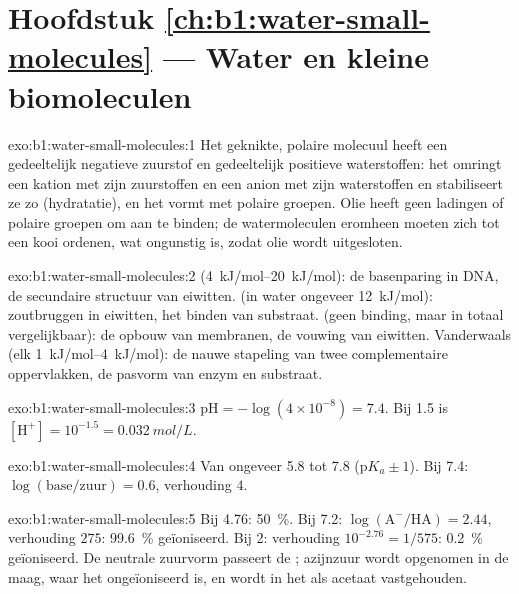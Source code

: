 \section*{Hoofdstuk \ref{ch:b1:water-small-molecules} --- Water en kleine biomoleculen}

\begin{solution}{exo:b1:water-small-molecules:1}
Het geknikte, polaire molecuul heeft een gedeeltelijk negatieve zuurstof en
gedeeltelijk positieve waterstoffen: het omringt een kation met zijn zuurstoffen
en een anion met zijn waterstoffen en stabiliseert ze zo (hydratatie), en het
vormt  met polaire groepen. Olie heeft geen ladingen of polaire
groepen om aan te binden; de watermoleculen eromheen moeten zich tot een kooi
ordenen, wat ongunstig is, zodat olie wordt uitgesloten.
\end{solution}

\begin{solution}{exo:b1:water-small-molecules:2}
 (\qtyrange{4}{20}{kJ/mol}): de basenparing in DNA, de secundaire
structuur van eiwitten.  (in water ongeveer \qty{12}{kJ/mol}):
zoutbruggen in eiwitten, het binden van substraat.  (geen
binding, maar in totaal vergelijkbaar): de opbouw van membranen, de vouwing van
eiwitten. Vanderwaals (elk \qtyrange{1}{4}{kJ/mol}): de nauwe stapeling van twee
complementaire oppervlakken, de pasvorm van enzym en substraat.
\end{solution}

\begin{solution}{exo:b1:water-small-molecules:3}
$\mathrm{pH} = -\log(4\times 10^{-8}) = 7.4$. Bij  1.5 is
$[\mathrm{H^+}] = 10^{-1.5} = \qty{0.032}{mol/L}$.
\end{solution}

\begin{solution}{exo:b1:water-small-molecules:4}
Van ongeveer 5.8 tot 7.8 (p$K_a \pm 1$). Bij 7.4: $\log(\text{base}/\text{zuur})
= 0.6$, verhouding $4$.
\end{solution}

\begin{solution}{exo:b1:water-small-molecules:5}
Bij  4.76: \qty{50}{\%}. Bij 7.2: $\log(\mathrm{A^-}/\mathrm{HA}) =
2.44$, verhouding $275$: \qty{99.6}{\%} geïoniseerd. Bij  2: verhouding $10^{-2.76} =
1/575$: \qty{0.2}{\%} geïoniseerd. De neutrale zuurvorm passeert de
; azijnzuur wordt opgenomen in de maag, waar het ongeïoniseerd
is, en wordt in het  als acetaat vastgehouden.
\end{solution}

